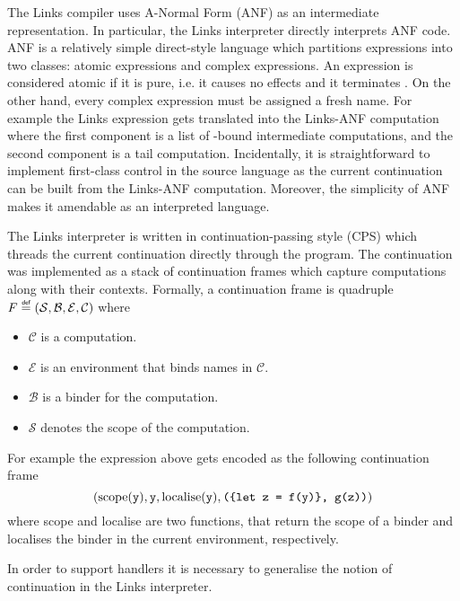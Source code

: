 The Links compiler uses A-Normal Form (ANF) as an intermediate representation. In particular, the Links interpreter directly interprets ANF code.
ANF is a relatively simple direct-style language which partitions expressions into two classes: atomic expressions and complex expressions. An expression is considered atomic if it is pure, i.e. it causes no effects and it terminates \cite{Flanagan1993}. On the other hand, every complex expression must be assigned a fresh name. For example the Links expression  gets translated into the Links-ANF computation  where the first component is a list of -bound intermediate computations, and the second component is a tail computation. Incidentally, it is straightforward to implement first-class control in the source language as the current continuation can be built from the Links-ANF computation. Moreover, the simplicity of ANF makes it amendable as an interpreted language.

The Links interpreter is written in continuation-passing style (CPS) which threads the current continuation directly through the program. The continuation was implemented as a stack of continuation frames which capture computations along with their contexts. Formally, a continuation frame is quadruple $F \defas (\mathcal{S},\mathcal{B},\mathcal{E},\mathcal{C})$ where
\begin{itemize}
  \item $\mathcal{C}$ is a computation.
  \item $\mathcal{E}$ is an environment that binds names in $\mathcal{C}$.
  \item $\mathcal{B}$ is a binder for the computation.
  \item $\mathcal{S}$ denotes the scope of the computation.
\end{itemize}
For example the expression above gets encoded as the following continuation frame
\[ (\text{scope}(\texttt{y}), \texttt{y}, \text{localise}(\texttt{y}), \texttt{(\{let z = f(y)\}, g(z))}) \]
where scope and localise are two functions, that return the scope of a binder and localises the binder in the current environment, respectively.

In order to support handlers it is necessary to generalise the notion of continuation in the Links interpreter.